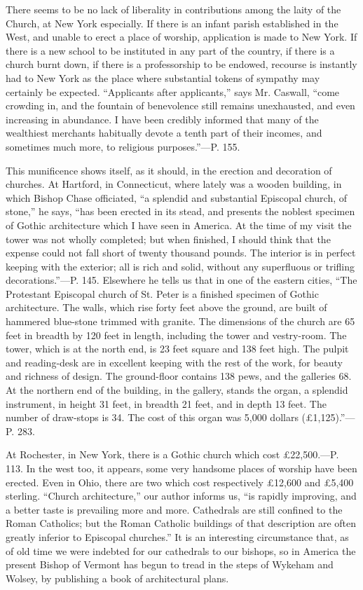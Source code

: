 There seems to be no lack of liberality in
contributions among the laity of the Church, at New York especially.
If there is an infant parish established in the West, and unable to
erect a place of worship, application is made to New York. If there is
a new school to be instituted in any part of the country, if there is
a church burnt down, if there is a professorship to be endowed,
recourse is instantly had to New York as the place where substantial
tokens of sympathy may certainly be expected. ``Applicants after
applicants,'' says Mr. Caswall, ``come crowding in, and the fountain of
benevolence still remains unexhausted, and even increasing in
abundance. I have been credibly informed that many of the wealthiest
merchants habitually devote a tenth part of their incomes, and
sometimes much more, to religious purposes.''—P. 155.

This munificence shows itself, as it should, in
the erection and decoration of churches. At Hartford, in Connecticut,
where lately was a wooden building, in which Bishop Chase officiated, ``a
splendid and substantial Episcopal church, of stone,'' he says, ``has
been erected in its stead, and presents the noblest specimen of Gothic
architecture which I have seen in America. At the time of my visit the
tower was not wholly completed; but when finished, I should think that
the expense could not fall short of twenty thousand pounds. The
interior is in perfect keeping with the exterior; all is rich
and solid, without any superfluous or trifling decorations.''—P. 145.
Elsewhere he tells us that in one of the eastern cities, ``The
Protestant Episcopal church of St. Peter is a finished specimen of
Gothic architecture. The walls, which rise forty feet above the
ground, are built of hammered blue-stone trimmed with granite. The
dimensions of the church are 65 feet in breadth by 120 feet in length,
including the tower and vestry-room. The tower, which is at the north
end, is 23 feet square and 138 feet high. The pulpit and reading-desk
are in excellent keeping with the rest of the work, for beauty and
richness of design. The ground-floor contains 138 pews, and the
galleries 68. At the northern end of the building, in the gallery,
stands the organ, a splendid instrument, in height 31 feet, in breadth
21 feet, and in depth 13 feet. The number of draw-stops is 34. The
cost of this organ was 5,000 dollars (£1,125).''—P. 283.

At Rochester, in New York, there is a Gothic
church which cost £22,500.—P. 113. In the west too, it appears,
some very handsome places of worship have been erected. Even in Ohio,
there are two which cost respectively £12,600 and £5,400 sterling. ``Church
architecture,'' our author informs us, ``is rapidly improving, and a
better taste is prevailing more and more. Cathedrals are still
confined to the Roman Catholics; but the Roman Catholic buildings of
that description are often greatly inferior to Episcopal churches.'' It
is an interesting circumstance that, as of old time we were indebted
for our cathedrals to our bishops, so in America the present Bishop of
Vermont has begun to tread in the steps of Wykeham and Wolsey, by
publishing a book of architectural plans.

